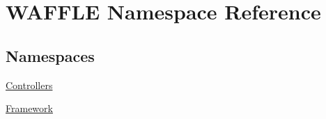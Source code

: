 \hypertarget{namespace_w_a_f_f_l_e}{}\section{W\+A\+F\+F\+LE Namespace Reference}
\label{namespace_w_a_f_f_l_e}
\subsection*{Namespaces}
\begin{DoxyCompactItemize}
\item 
 \hyperlink{namespace_w_a_f_f_l_e_1_1_controllers}{Controllers}
\item 
 \hyperlink{namespace_w_a_f_f_l_e_1_1_framework}{Framework}
\end{DoxyCompactItemize}
